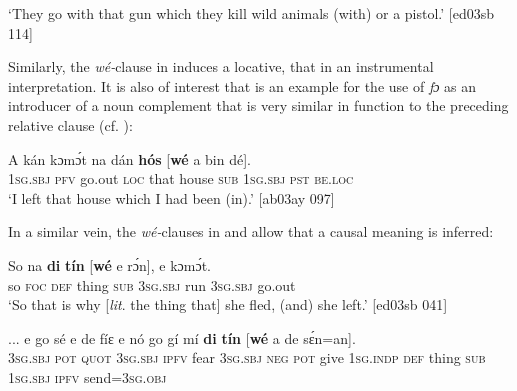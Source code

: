 \glt ‘They go with that gun which they kill wild animals (with) or a pistol.’ [ed03sb 114]
\z

Similarly, the \textit{wé-}clause in  induces a locative, that in  an instrumental interpretation. It is also of interest that  is an example for the use of \textit{fɔ} as an introducer of a noun complement that is very similar in function to the preceding relative clause (cf. ): 


\ea%
    \label{ex:key:1439}
    \gll A    kán  kɔmɔ́t  na  dán  \textbf{hós}    [\textbf{wé}    a    bin  dé].\\
\textsc{1sg.sbj}  \textsc{pfv}  go.out  \textsc{loc}  that  house   \textsc{sub}    \textsc{1sg.sbj}  \textsc{pst}  \textsc{be.loc}\\

\glt ‘I left that house which I had been (in).’ [ab03ay 097]
\z


\ea%
    \label{ex:key:1440}
\z\z

In a similar vein, the \textit{wé-}clauses in  and  allow that a causal meaning is inferred:


\ea%
    \label{ex:key:1441}
    \gll So  na  \textbf{di}  \textbf{tín}    [\textbf{wé}  e    rɔ́n],  e  kɔmɔ́t.\\
so  \textsc{foc}  \textsc{def}  thing   \phantom{[}\textsc{sub}  \textsc{3sg.sbj}  run  \textsc{3sg.sbj}  go.out\\

\glt ‘So that is why [\textit{lit}. the thing that] she fled, (and) she left.’ [ed03sb 041]
\z


\ea%
    \label{ex:key:1442}
    \gll \op...\cp{}  e    go  sé    e    de  fíɛ  e    nó  go  gí  mí
\textbf{di}  \textbf{tín}    [\textbf{wé}    a    de  sɛ́n=an].\\
{}  \textsc{3sg.sbj}  \textsc{pot}  \textsc{quot}    \textsc{3sg.sbj}  \textsc{ipfv}  fear  \textsc{3sg.sbj}  \textsc{neg}  \textsc{pot}  give  \textsc{1sg.indp}
\textsc{def}  thing   \phantom{[}\textsc{sub}    \textsc{1sg.sbj}  \textsc{ipfv}  send=\textsc{3sg.obj}\\

